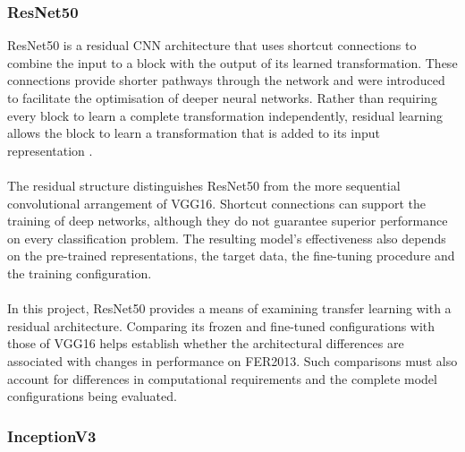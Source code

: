 \documentclass[12pt, a4paper]{report}
\let\oldsubsubsection\subsubsection
\renewcommand{\subsubsection}{%
    \Needspace{6\baselineskip}%
    \oldsubsubsection
}
\begin{document}
				\subsubsection{ResNet50}
				
					ResNet50 is a residual CNN architecture that uses shortcut connections to combine the input to a block with the output of its learned transformation. These connections provide shorter pathways through the network and were introduced to facilitate the optimisation of deeper neural networks. Rather than requiring every block to learn a complete transformation independently, residual learning allows the block to learn a transformation that is added to its input representation \cite{he2016resnet}.\\\\
					The residual structure distinguishes ResNet50 from the more sequential convolutional arrangement of VGG16. Shortcut connections can support the training of deep networks, although they do not guarantee superior performance on every classification problem. The resulting model's effectiveness also depends on the pre-trained representations, the target data, the fine-tuning procedure and the training configuration.\\\\
					In this project, ResNet50 provides a means of examining transfer learning with a residual architecture. Comparing its frozen and fine-tuned configurations with those of VGG16 helps establish whether the architectural differences are associated with changes in performance on FER2013. Such comparisons must also account for differences in computational requirements and the complete model configurations being evaluated.
				
				\subsubsection{InceptionV3}
				
\end{document}
